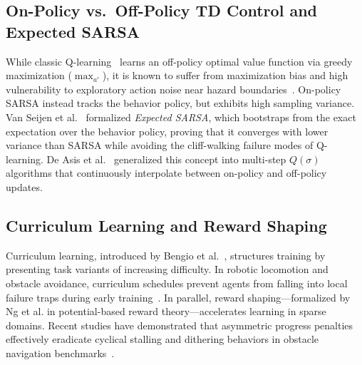 \subsection{On-Policy vs.\ Off-Policy TD Control and Expected SARSA}
While classic Q-learning~\cite{watkins1992q} learns an off-policy optimal value function via greedy maximization ($\max_{a'}$), it is known to suffer from maximization bias and high vulnerability to exploratory action noise near hazard boundaries~\cite{sutton2018reinforcement}. On-policy SARSA instead tracks the behavior policy, but exhibits high sampling variance. Van Seijen et al.~\cite{van2009theoretical} formalized \textit{Expected SARSA}, which bootstraps from the exact expectation over the behavior policy, proving that it converges with lower variance than SARSA while avoiding the cliff-walking failure modes of Q-learning. De Asis et al.~\cite{de2018multi} generalized this concept into multi-step $Q(\sigma)$ algorithms that continuously interpolate between on-policy and off-policy updates.

\subsection{Curriculum Learning and Reward Shaping}
Curriculum learning, introduced by Bengio et al.~\cite{bengio2009curriculum}, structures training by presenting task variants of increasing difficulty. In robotic locomotion and obstacle avoidance, curriculum schedules prevent agents from falling into local failure traps during early training~\cite{chen2024curriculum,ray2024dynamic}. In parallel, reward shaping—formalized by Ng et al. in potential-based reward theory—accelerates learning in sparse domains. Recent studies have demonstrated that asymmetric progress penalties effectively eradicate cyclical stalling and dithering behaviors in obstacle navigation benchmarks~\cite{zhang2023comparative}.
